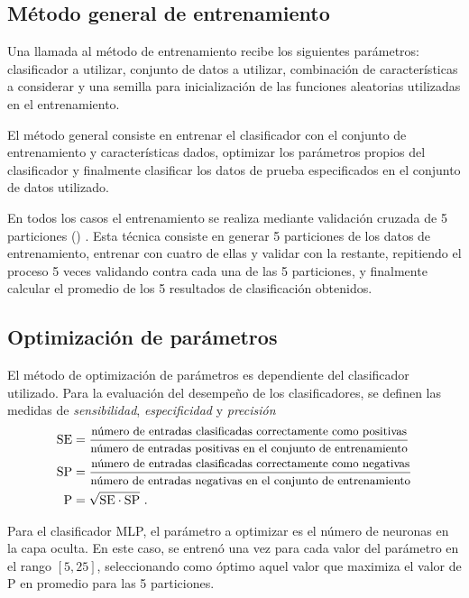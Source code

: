 \documentclass[12pt,bibliography=oldstyle,DIV=12,parskip=half-,titlepage]{scrartcl}
\begin{document}
\subsection{Método general de entrenamiento}
Una llamada al método de entrenamiento recibe los siguientes
parámetros: clasificador a utilizar, conjunto de datos a utilizar,
combinación de características a considerar y una semilla para
inicialización de las funciones aleatorias utilizadas en el
entrenamiento.

El método general consiste en entrenar el clasificador con el conjunto
de entrenamiento y características dados, optimizar los parámetros
propios del clasificador y finalmente clasificar los datos de prueba
especificados en el conjunto de datos utilizado.

En todos los casos el entrenamiento se realiza mediante validación
cruzada de 5 particiones ()
\cite{crossval}. Esta técnica consiste en generar 5 particiones de los
datos de entrenamiento, entrenar con cuatro de ellas y validar con la
restante, repitiendo el proceso 5 veces validando contra cada una de
las 5 particiones, y finalmente calcular el promedio de los 5
resultados de clasificación obtenidos.
%
\subsection{Optimización de parámetros}
El método de optimización de parámetros es dependiente del
clasificador utilizado. Para la evaluación del desempeño de los
clasificadores, se definen las medidas de \emph{sensibilidad},
\emph{especificidad} y \emph{precisión}
\begin{align}
  \textrm{SE} &= \frac{\textrm{\small número de entradas clasificadas
      correctamente como positivas}} {\textrm{\small número de entradas
      positivas en el conjunto de entrenamiento}}\\
  \textrm{SP} &= \frac{\textrm{\small número de entradas
      clasificadas correctamente como negativas}}{\textrm{\small número de
      entradas negativas en el conjunto de entrenamiento}}\\
  \textrm{P} &= \sqrt{\textrm{SE}\cdot\textrm{SP}}\,\,\textrm{.}
\end{align}

Para el clasificador MLP, el parámetro a optimizar es el número de
neuronas en la capa oculta. En este caso, se entrenó una vez para
cada valor del parámetro en el rango $[5,25]$, seleccionando como
óptimo aquel valor que maximiza el valor de P en promedio para las
5 particiones.
\end{document}
